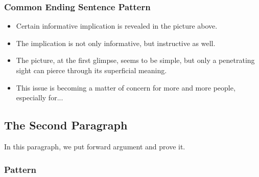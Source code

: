 \documentclass{article}
\begin{document}
\subsubsection{Common Ending Sentence Pattern}
\label{sec:comm-ending-sent-3}

\begin{itemize}
\item Certain informative implication is revealed in the picture above.
\item The implication is not only informative, but instructive as well.
\item The picture, at the first glimpse, seems to be simple, but only a penetrating sight
  can pierce through its superficial meaning.
\item This issue is becoming a matter of concern for more and more people, especially for...
\end{itemize}

\subsection{The Second Paragraph}
\label{sec:second-paragraph}
In this paragraph, we put forward argument and prove it.

\subsubsection{Pattern}
\label{sec:pattern-1}
\end{document}
